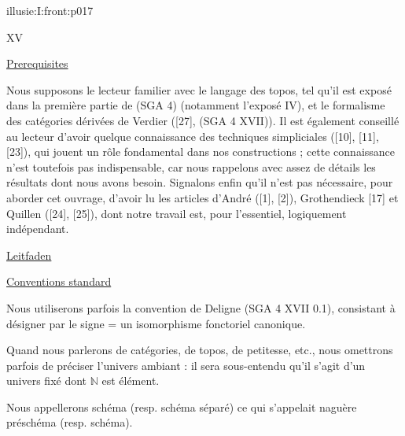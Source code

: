 \IllusieSetPhysicalPageSize{450.6bp}{704bp}
\begin{illusiefrontpage}{illusie:I:front:p017}{}
\begin{center}\fontsize{10}{12}\selectfont XV\end{center}
\vspace{8bp}
\hypertarget{illusie:I:prereq}{}%
\underline{Prerequisites}

\vspace{6bp}
\hypertarget{illusie:I:prereq:p1}{}%
\hspace*{22bp}Nous supposons le lecteur familier avec le langage des topos, tel qu'il est
exposé dans la première partie de (SGA 4) (notamment l'exposé IV), et le formalisme
des catégories dérivées de Verdier ([27], (SGA 4 XVII)). Il est également conseillé
au lecteur d'avoir quelque connaissance des techniques simpliciales ([10], [11],
[23]), qui jouent un rôle fondamental dans nos constructions ; cette connaissance
n'est toutefois pas indispensable, car nous rappelons avec assez de détails les
résultats dont nous avons besoin. Signalons enfin qu'il n'est pas nécessaire, pour
aborder cet ouvrage, d'avoir lu les articles d'André ([1], [2]), Grothendieck [17]
et Quillen ([24], [25]), dont notre travail est, pour l'essentiel, logiquement
indépendant.

\vspace{8bp}
\hypertarget{illusie:I:prereq:guide}{}%
\underline{Leitfaden}

\vspace{2bp}
\hypertarget{illusie:I:prereq:guide:d1}{}%
\begin{center}\IllusieChapterGuide\end{center}

\vspace{2bp}
\hypertarget{illusie:I:conv}{}%
\underline{Conventions standard}

\vspace{6bp}
\hypertarget{illusie:I:conv:p1}{}%
\hspace*{22bp}Nous utiliserons parfois la convention de Deligne (SGA 4 XVII 0.1),
consistant à désigner par le signe \textquotedbl{} = \textquotedbl{} un
isomorphisme fonctoriel canonique.

\vspace{4bp}
\hypertarget{illusie:I:conv:p2}{}%
\hspace*{22bp}Quand nous parlerons de catégories, de topos, de
\textquotedbl{}petitesse\textquotedbl{}, etc., nous omettrons parfois de préciser
l'univers ambiant : il sera sous-entendu qu'il s'agit d'un univers fixé dont
$\mathbb{N}$ est élément.

\vspace{4bp}
\hypertarget{illusie:I:conv:p3}{}%
\hspace*{22bp}Nous appellerons schéma (resp. schéma séparé) ce qui s'appelait naguère
préschéma (resp. schéma).
\end{illusiefrontpage}

